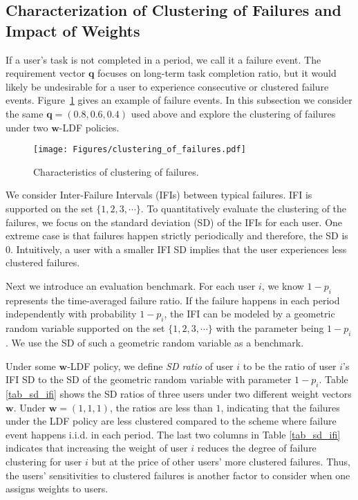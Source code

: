 \documentclass[prodmode,acmtompecs]{acmsmall}
\newcommand{\reqvec}{\mathbf{q}}
\newcommand{\myComments}[1]{}
\newcommand{\commentEnd}{\myComments{End}}
\begin{document}
\commentEnd\fi

\subsection{Characterization of Clustering of Failures and Impact of Weights}
\label{subsection_characterization_of_failure_clustering}
If a user's task is not completed in a period, we call it a failure event. The requirement vector $\reqvec$ focuses on long-term task completion ratio, but it would likely be undesirable for a user to experience consecutive or clustered failure events. 
Figure~\ref{figure_clustering_of_failures} gives an example of failure events. 
In this subsection we consider the same $\mathbf{q} = (0.8, 0.6, 0.4)$ used above and explore the clustering of failures under two $\mathbf{w}$-LDF policies. 

\begin{figure}[htp]
  \centering
  \texttt{[image: Figures/clustering\_of\_failures.pdf]}
  \caption{Characteristics of clustering of failures. }
  \label{figure_clustering_of_failures}
\end{figure}

We consider Inter-Failure Intervals (IFIs) between typical failures. 
IFI is supported on the set $\{1, 2, 3, \cdots\}$. To quantitatively evaluate the clustering of the failures, we focus on the standard deviation (SD) of the IFIs for each user. 
One extreme case is that failures happen strictly periodically and therefore, the SD is $0$. 
Intuitively, a user with a smaller IFI SD implies that the user experiences less clustered failures. 

Next we introduce an evaluation benchmark. 
For each user $i$, we know $1 - p_i$ represents the time-averaged failure ratio. 
If the failure happens in each period independently with probability $1 - p_i$, the IFI can be modeled by a geometric random variable supported on the set $\{1, 2, 3, \cdots\}$ with the parameter being $1 - p_i$. We use the SD of such a geometric random variable as a benchmark.  

Under some $\mathbf{w}$-LDF policy, we define {\em SD ratio} of user $i$ to be the ratio of user $i$'s IFI SD to the SD of the geometric random variable with parameter $1 - p_i$. 
Table \ref{tab_sd_ifi} shows the SD ratios of three users under two different weight vectors $\mathbf{w}$. 
Under $\mathbf{w} = (1,1,1)$, the ratios are less than $1$, indicating that the failures under the LDF policy are less clustered compared to the scheme where failure event happens i.i.d. in each period. 
The last two columns in Table \ref{tab_sd_ifi} indicates that increasing the weight of user $i$ reduces the degree of failure clustering for user $i$ but at the price of other users' more clustered failures. Thus, the users' sensitivities to clustered failures is another factor to consider when one assigns weights to users. 
\end{document}
